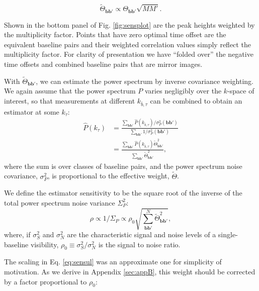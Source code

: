 \documentclass[twocolumn,apj,numberedappendix]{emulateapj}
\renewcommand\[{\begin{equation}}
\renewcommand\]{\end{equation}}
\begin{document}
\begin{equation}
\widetilde{\Theta}_{\boldsymbol{bb'}} \propto \Theta_{\boldsymbol{bb'}}\sqrt{MM'}.\label{eq:sensul}
\end{equation}

Shown in the bottom panel of Fig. \ref{fig:sensplot} are the peak heights weighted
by the multiplicity factor. Points that have zero optimal time offset are the equivalent baseline pairs and their weighted correlation values simply reflect the multiplicity factor. For clarity of presentation we have ``folded over'' the negative time offsets and combined baseline pairs that are mirror images.  

With $\widetilde{\Theta}_{\boldsymbol{bb'}}$, we can estimate the power spectrum by inverse covariance weighting. We again assume that the power spectrum $P$ varies negligibly over the $k$-space of interest, so that measurements at different $k_{\bar{b}, \tau}$ can be combined to obtain an estimator at some $k_\tau$:
\begin{equation}
\begin{aligned}
 \hat{P}(k_{\tau}) &= \frac{\sum_{\boldsymbol{bb'}}\hat{P}(k_{\bar{b}, \tau})/\sigma_P^2(\boldsymbol{bb'})}{\sum_{\boldsymbol{bb'}}1/\sigma_P^2(\boldsymbol{bb'})}\\
 &= \frac{\sum_{\boldsymbol{bb'}}\hat{P}(k_{\bar{b}, \tau})\widetilde{\Theta}_{\boldsymbol{bb'}}^2}{\sum_{\boldsymbol{bb'}}\widetilde{\Theta}_{\boldsymbol{bb'}}^2},
 \end{aligned}
\end{equation}
where the sum is over classes of baseline pairs, and the power spectrum noise covariance, $\sigma_P^2$, is proportional to the effective weight, $\widetilde{\Theta}$. 


We define the estimator sensitivity to be the square root of the inverse of the total power spectrum noise variance $\Sigma_P^2$:
\begin{equation}
\rho \propto 1/\Sigma_P \propto \rho_0\sqrt{\sum_{\boldsymbol{bb'}}^N\widetilde{\Theta}^2_{\boldsymbol{bb'}}},
\end{equation}
where, if $\sigma_S^2$ and $\sigma_N^2$ are the characteristic signal and noise levels of a single-baseline visibility, $\rho_0\equiv\sigma_S^2/\sigma_N^2$ is the signal to noise ratio. 


The scaling in Eq. \eqref{eq:sensul} was an approximate one for simplicity of motivation. As we derive in Appendix \ref{sec:appB}, this weight should be corrected by a factor proportional to $\rho_0$:
\end{document}
